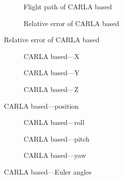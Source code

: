 \begin{figure}[H]
    \centering
    \begin{subfigure}{0.45\textwidth}
        
        \caption{Flight path of CARLA based}\label{fig:carla-path}
    \end{subfigure}
    \begin{subfigure}{0.45\textwidth}
        
        \caption{Relative error of CARLA based}\label{fig:carla-error}
    \end{subfigure}
\end{figure}

\begin{figure}[H]
    \centering
    \begin{subfigure}{0.3\textwidth}
        
        \caption{CARLA based---X}
    \end{subfigure}
    \hfill
    \begin{subfigure}{0.3\textwidth}
        
        \caption{CARLA based---Y}
    \end{subfigure}
    \hfill
    \begin{subfigure}{0.3\textwidth}
        
        \caption{CARLA based---Z}
    \end{subfigure}
    \caption{CARLA based---position}\label{fig:carla-pos}
\end{figure}

\begin{figure}[H]
    \centering
    \begin{subfigure}{0.3\textwidth}
        
        \caption{CARLA based---roll}
    \end{subfigure}
    \hfill
    \begin{subfigure}{0.3\textwidth}
        
        \caption{CARLA based---pitch}
    \end{subfigure}
    \hfill
    \begin{subfigure}{0.3\textwidth}
        
        \caption{CARLA based---yaw}
    \end{subfigure}
    \caption{CARLA based---Euler angles}\label{fig:carla-euler}
\end{figure}

